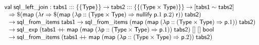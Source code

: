 \documentclass{article}
\newcommand{\mt}[1]{\mathsf{#1}}
\newcommand{\rc}{+ \hspace{-.075in} + \;}
\begin{document}
$$\begin{array}{l}
 \mt{val} \; \mt{sql\_left\_join} : \mt{tabs1} ::: \{\{\mt{Type}\}\} \to \mt{tabs2} ::: \{\{(\mt{Type} \times \mt{Type})\}\} \to [\mt{tabs1} \sim \mt{tabs2}] \\
 \hspace{.1in} \Rightarrow \$(\mt{map} \; (\lambda \mt{r} \Rightarrow \$(\mt{map} \; (\lambda \mt{p} :: (\mt{Type} \times \mt{Type}) \Rightarrow \mt{nullify} \; \mt{p}.1 \; \mt{p}.2) \; \mt{r})) \; \mt{tabs2}) \\
 \hspace{.1in} \to \mt{sql\_from\_items} \; \mt{tabs1} \to \mt{sql\_from\_items} \; (\mt{map} \; (\mt{map} \; (\lambda \mt{p} :: (\mt{Type} \times \mt{Type}) \Rightarrow \mt{p}.1)) \; \mt{tabs2}) \\
 \hspace{.1in} \to \mt{sql\_exp} \; (\mt{tabs1} \rc \mt{map} \; (\mt{map} \; (\lambda \mt{p} :: (\mt{Type} \times \mt{Type}) \Rightarrow \mt{p}.1)) \; \mt{tabs2}) \; [] \; [] \; \mt{bool} \\
 \hspace{.1in} \to \mt{sql\_from\_items} \; (\mt{tabs1} \rc \mt{map} \; (\mt{map} \; (\lambda \mt{p} :: (\mt{Type} \times \mt{Type}) \Rightarrow \mt{p}.2)) \; \mt{tabs2})
\end{array}$$
\end{document}
